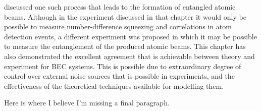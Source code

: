  discussed one such process that leads to the formation of entangled atomic beams.  Although in the experiment discussed in that chapter it would only be possible to measure number-difference squeezing and correlations in atom detection events, a different experiment was proposed in which it may be possible to measure the entanglement of the produced atomic beams.  This chapter has also demonstrated the excellent agreement that is achievable between theory and experiment for BEC systems.  This is possible due to extraordinary degree of control over external noise sources that is possible in experiments, and the effectiveness of the theoretical techniques available for modelling them.

Here is where I believe I'm missing a final paragraph.







